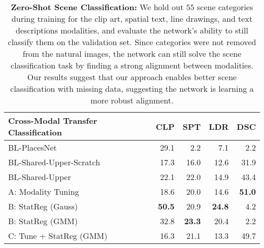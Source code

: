 \documentclass[10pt,journal,compsoc]{IEEEtran}
\begin{document}
    \begin{table}[t]
        \centering
        \bgroup
        \def\arraystretch{1.3}%
        \begin{tabular}{|l|r r r r|}
                \hline
         Cross-Modal Transfer Classification & {\bf CLP}  & {\bf SPT}  & {\bf LDR}  & {\bf DSC}  \\ 
        \hline{BL-PlacesNet} & 29.1 & 2.2 & 7.1 & 2.2 \\
        {BL-Shared-Upper-Scratch }   & 17.3 & 16.0 & 12.6 & 31.9 \\ 
        {BL-Shared-Upper}   & 22.1 & 22.0 & 14.9 & 43.4 \\ 
        \hline{A: Modality Tuning }  & 18.6 & 20.0 & 14.6 &  {\bf 51.0} \\ 
        {B: StatReg (Gauss)}   &  {\bf 50.5} &  20.9 &  {\bf 24.8} & 4.2 \\ 
        {B: StatReg (GMM) }   &  32.8 &  {\bf 23.3} &  20.4 & 2.2 \\ 
        {C: Tune + StatReg (GMM) }  & 16.3 & 21.1 & 13.3 & 49.7 \\ 
        \hline
        \end{tabular}
        \egroup
        \caption{\textbf{Zero-Shot Scene Classification:} We hold out $55$ scene categories during training for the clip art, spatial text, line drawings, and text descriptions modalities, and evaluate the network's ability to still classify them on the validation set. Since categories were not removed from the natural images, the network can still solve the scene classification task by finding a strong alignment
        between modalities. Our results suggest that our approach enables better scene classification with missing data, suggesting the network is learning a more robust alignment.}
        \label{tab:zs_scene}
    \end{table}
\end{document}
